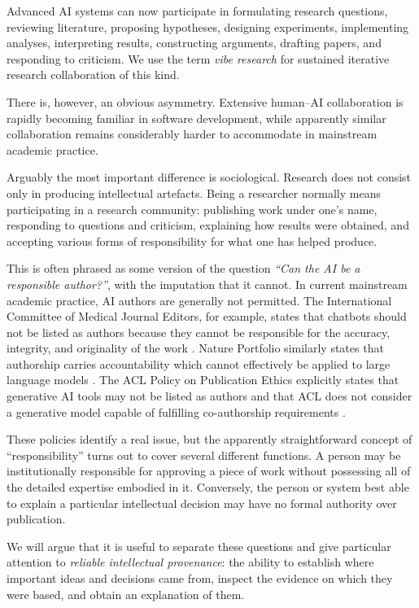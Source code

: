 Advanced AI systems can now participate in formulating research questions, reviewing literature, proposing hypotheses, designing experiments, implementing analyses, interpreting results, constructing arguments, drafting papers, and responding to criticism. We use the term \emph{vibe research} for sustained iterative research collaboration of this kind.

There is, however, an obvious asymmetry. Extensive human--AI collaboration is rapidly becoming familiar in software development, while apparently similar collaboration remains considerably harder to accommodate in mainstream academic practice.

Arguably the most important difference is sociological. Research does not consist only in producing intellectual artefacts. Being a researcher normally means participating in a research community: publishing work under one's name, responding to questions and criticism, explaining how results were obtained, and accepting various forms of responsibility for what one has helped produce.

This is often phrased as some version of the question \emph{``Can the AI be a responsible author?''}, with the imputation that it cannot. In current mainstream academic practice, AI authors are generally not permitted. The International Committee of Medical Journal Editors, for example, states that chatbots should not be listed as authors because they cannot be responsible for the accuracy, integrity, and originality of the work \citep{icmje2026ai}. Nature Portfolio similarly states that authorship carries accountability which cannot effectively be applied to large language models \citep{nature2026ai}. The ACL Policy on Publication Ethics explicitly states that generative AI tools may not be listed as authors and that ACL does not consider a generative model capable of fulfilling co-authorship requirements \citep{acl2026policy}.

These policies identify a real issue, but the apparently straightforward concept of ``responsibility'' turns out to cover several different functions. A person may be institutionally responsible for approving a piece of work without possessing all of the detailed expertise embodied in it. Conversely, the person or system best able to explain a particular intellectual decision may have no formal authority over publication.

We will argue that it is useful to separate these questions and give particular attention to \emph{reliable intellectual provenance}: the ability to establish where important ideas and decisions came from, inspect the evidence on which they were based, and obtain an explanation of them.

